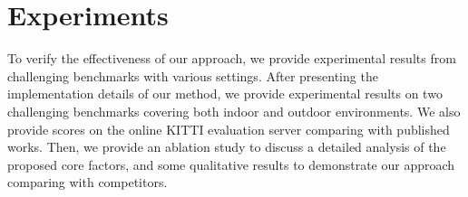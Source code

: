 \documentclass[10pt,twocolumn,letterpaper]{article}
\begin{document}
\begin{table}[t]
	\begin{center}
		\centering		
	\end{center}
	\caption{Result on the online KITTI evaluation server.}
	\label{tb:kitti_online_benchmark}
\end{table}

\section{Experiments}
\label{sec:experiments}
To verify the effectiveness of our approach, we provide experimental results from challenging benchmarks with various settings.
After presenting the implementation details of our method, we provide experimental results on two challenging benchmarks covering both indoor and outdoor environments.
We also provide scores on the online KITTI evaluation server comparing with published works.
Then, we provide an ablation study to discuss a detailed analysis of the proposed core factors, and some qualitative results to demonstrate our approach comparing with competitors.
\end{document}
